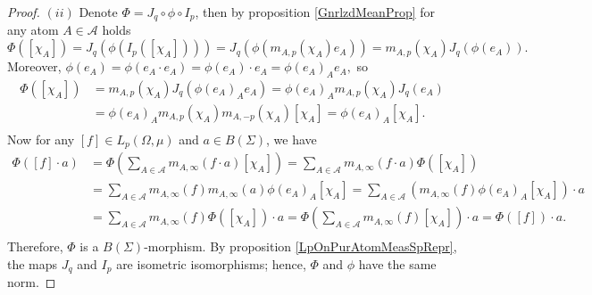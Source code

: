 \documentclass[12pt]{article}
\begin{document}
\begin{proof}
    $(ii)$ Denote $\Phi=J_q\circ \phi\circ I_p$, then by 
    proposition \ref{GnrlzdMeanProp} for any atom $A\in\mathcal{A}$ holds
    $
        \Phi([\chi_A])
        =J_q(\phi(I_p([\chi_A])))
        =J_q(\phi(m_{A,p}(\chi_A)e_A))
        =m_{A,p}(\chi_A)J_q(\phi(e_A)).
    $
    Moreover,
    $
        \phi(e_A)
        =\phi(e_A\cdot e_A)
        =\phi(e_A)\cdot e_A
        =\phi(e_A)_A e_A,
    $
    so
    \[
    \begin{aligned}
        \Phi([\chi_A])
        &=m_{A,p}(\chi_A)J_q(\phi(e_A)_A e_A) 
        =\phi(e_A)_A m_{A,p}(\chi_A)J_q( e_A) \\
        &=\phi(e_A)_A m_{A,p}(\chi_A)m_{A,-p}(\chi_A) [\chi_A] 
        =\phi(e_A)_A [\chi_A]. \\
    \end{aligned}
    \]
    Now for any $[f]\in L_p(\Omega, \mu)$ and $a\in B(\Sigma)$, we have
    \[
    \begin{aligned}
        \Phi([f]\cdot a)
        &=\Phi\left(
            \sum_{A\in\mathcal{A}} m_{A,\infty}(f\cdot a)[\chi_A]
        \right) 
        =\sum_{A\in\mathcal{A}} m_{A,\infty}(f\cdot a) \Phi([\chi_A]) \\
        &=\sum_{A\in\mathcal{A}} 
            m_{A,\infty}(f) m_{A,\infty}(a) \phi(e_A)_A [\chi_A] 
        =\sum_{A\in\mathcal{A}} 
            (m_{A,\infty}(f) \phi(e_A)_A [\chi_A])\cdot a \\
        &=\sum_{A\in\mathcal{A}} 
            m_{A,\infty}(f) \Phi([\chi_A])\cdot a 
        =\Phi\left(\sum_{A\in\mathcal{A}} 
            m_{A,\infty}(f) [\chi_A]\right)\cdot a 
        =\Phi([f])\cdot a. \\
    \end{aligned}
    \]
    Therefore, $\Phi$ is a $B(\Sigma)$-morphism. By 
    proposition \ref{LpOnPurAtomMeasSpRepr}, the maps $J_q$ and $I_p$ are 
    isometric isomorphisms; hence, $\Phi$ and $\phi$ have the same norm.
\end{proof}
\end{document}
